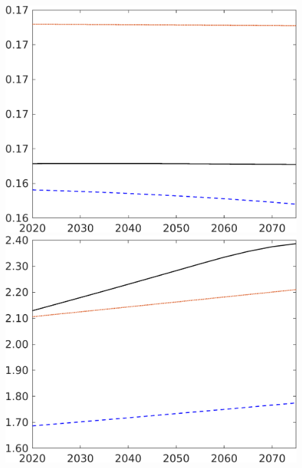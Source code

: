 \begin{figure}[h!!]
\begin{minipage}[]{0.32\textwidth}
	\end{minipage}
\begin{minipage}[]{0.32\textwidth}
\includegraphics[width=1\textwidth]{../../codding_model/own_basedOnFried/optimalPol_elastS_DisuSci/figures/all_1705/Extern_CompEff_Ln_spillover0_noskill0_sep1_BN0_ineq0_red0_etaa0.79_lgd0.png}
\end{minipage}
	\begin{minipage}[]{0.32\textwidth}
		\includegraphics[width=1\textwidth]{../../codding_model/own_basedOnFried/optimalPol_elastS_DisuSci/figures/all_1705/Extern_CompEff_wh_spillover0_noskill0_sep1_BN0_ineq0_red0_etaa0.79_lgd0.png}

\end{minipage}
\end{figure}
